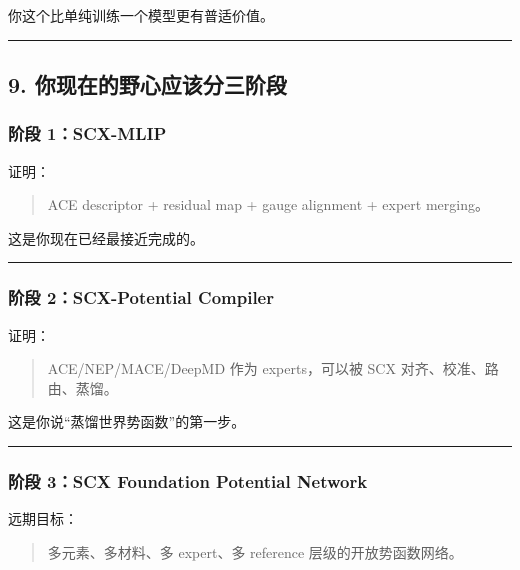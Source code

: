 \documentclass[
  12pt,
]{ctexart}
\begin{document}
你这个比单纯训练一个模型更有普适价值。

\begin{center}\rule{0.5\linewidth}{0.5pt}\end{center}

\subsection{9.
你现在的野心应该分三阶段}\label{ux4f60ux73b0ux5728ux7684ux91ceux5fc3ux5e94ux8be5ux5206ux4e09ux9636ux6bb5}

\subsubsection{阶段 1：SCX-MLIP}\label{ux9636ux6bb5-1scx-mlip}

证明：

\begin{quote}
ACE descriptor + residual map + gauge alignment + expert merging。
\end{quote}

这是你现在已经最接近完成的。

\begin{center}\rule{0.5\linewidth}{0.5pt}\end{center}

\subsubsection{阶段 2：SCX-Potential
Compiler}\label{ux9636ux6bb5-2scx-potential-compiler}

证明：

\begin{quote}
ACE/NEP/MACE/DeepMD 作为 experts，可以被 SCX 对齐、校准、路由、蒸馏。
\end{quote}

这是你说``蒸馏世界势函数''的第一步。

\begin{center}\rule{0.5\linewidth}{0.5pt}\end{center}

\subsubsection{阶段 3：SCX Foundation Potential
Network}\label{ux9636ux6bb5-3scx-foundation-potential-network}

远期目标：

\begin{quote}
多元素、多材料、多 expert、多 reference 层级的开放势函数网络。
\end{quote}
\end{document}
